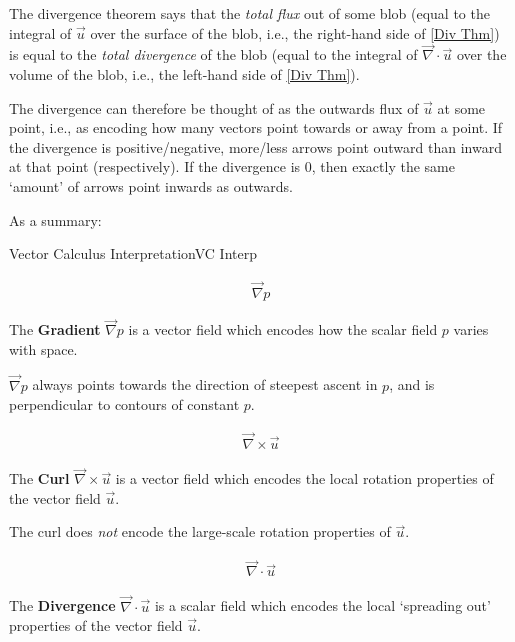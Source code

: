 The divergence theorem says that the \textit{total flux} out of some blob (equal to the integral of $\vec{u}$ over the surface of the blob, i.e., the right-hand side of \ref{Div Thm}) is equal to the \textit{total divergence} of the blob (equal to the integral of $\vec{\nabla}\cdot\vec{u}$ over the volume of the blob, i.e., the left-hand side of \ref{Div Thm}). 

The divergence can therefore be thought of as the outwards flux of $\vec{u}$ at some point, i.e., as encoding how many vectors point towards or away from a point. If the divergence is positive/negative, more/less arrows point outward than inward at that point (respectively). If the divergence is $0$, then exactly the same `amount' of arrows point inwards as outwards. 

As a summary:
\begin{fact}{Vector Calculus Interpretation}{VC Interp}\label{VC Interp}
    \begin{minipage}{.39\linewidth}
    \begin{tcolorbox}[colback=myyellow!50!white,colframe=mymagenta]
        \begin{align*}
            \vec{\nabla}p
        \end{align*}

        The \textbf{Gradient} $\vec{\nabla}p$ is a vector field which encodes how the scalar field $p$ varies with space.

        $\vec{\nabla}p$ always points towards the direction of steepest ascent in $p$, and is perpendicular to contours of constant $p$.
    \end{tcolorbox}
    \end{minipage}
    \begin{minipage}{.34\linewidth}
    \begin{tcolorbox}[colback=myyellow!50!white,colframe=mymagenta]
        \begin{align*}
            \vec{\nabla}\times \vec{u}
        \end{align*}

        The \textbf{Curl} $\vec{\nabla}\times \vec{u}$ is a vector field which encodes the local rotation properties of the vector field $\vec{u}$.

        The curl does \textit{not} encode the large-scale rotation properties of $\vec{u}$.
    \end{tcolorbox}
    \end{minipage}
    \begin{minipage}{.25\linewidth}
    \begin{tcolorbox}[colback=myyellow!50!white,colframe=mymagenta]
        \begin{align*}
            \vec{\nabla}\cdot\vec{u}
        \end{align*}

        The \textbf{Divergence} $\vec{\nabla}\cdot\vec{u}$ is a scalar field which encodes the local `spreading out' properties of the vector field $\vec{u}$.
    \end{tcolorbox}
    \end{minipage}
\end{fact}


